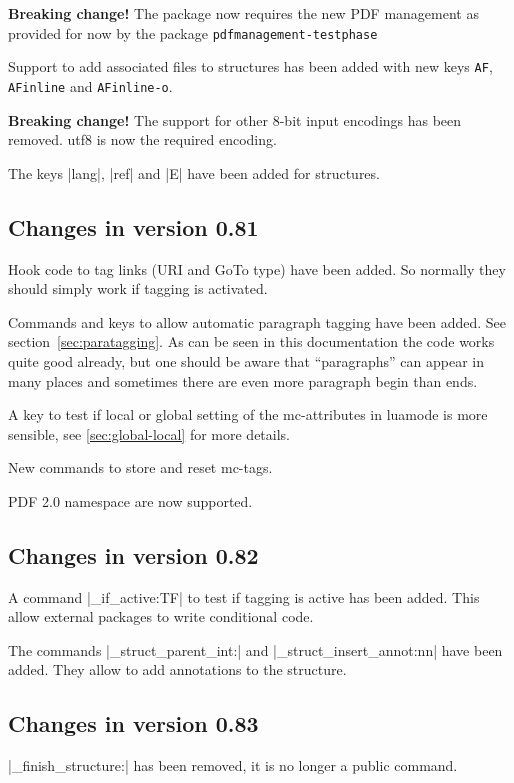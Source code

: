 \documentclass[DIV=12,parskip=half-,bibliography=totoc]{scrartcl}
\begin{document}
\textbf{Breaking change!} The package now requires the new PDF management as provided for now by the package \texttt{pdfmanagement-testphase}

Support to add associated files to structures has been added with new keys \texttt{AF}, \texttt{AFinline} and \texttt{AFinline-o}.

\textbf{Breaking change!} The support for other 8-bit input encodings has been removed.
utf8 is now the required encoding.

The keys |lang|, |ref| and |E| have been added for structures.

\subsection{Changes in version 0.81}

Hook code to tag links (URI and GoTo type) have been added. So normally they should simply work if tagging
is activated.

Commands and keys to allow automatic paragraph tagging have been added. See section~\ref{sec:paratagging}.
As can be seen in this documentation the code works quite good already, but one should be aware that \enquote{paragraphs} can appear in many places and sometimes there are even more paragraph begin than ends.

A key to test if local or global setting of the mc-attributes in luamode is more sensible, see \ref{sec:global-local} for more details.

New commands to store and reset mc-tags.

PDF 2.0 namespace are now supported.

\subsection{Changes in version 0.82}

A command |\tag_if_active:TF| to test if tagging is active has been added. This allow external packages to write conditional code.

The commands |\tag_struct_parent_int:| and |\tag_struct_insert_annot:nn| have been added. They allow to
add annotations to the structure.



\subsection{Changes in version 0.83}

|\tag_finish_structure:| has been removed, it is no longer a public command.
\end{document}
